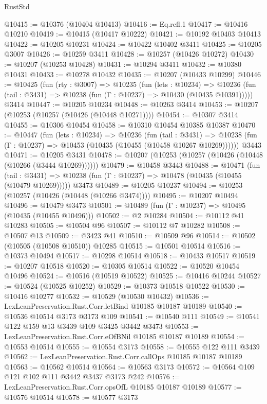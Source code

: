 \begin{lexlean}{RustStd}
\begin{coremodule}
@10415 := @10376 (@10404 @10413)
@10416 := Eq.refl.{1}
@10417 := @10416 @10210
@10419 := @10415 (@10417 @10222)
@10421 := @10192 @10403 @10413
@10422 := @10205 @10231
@10424 := @10422 @10402 @3411
@10425 := @10205 @3007
@10426 := @10259 @3411
@10428 := @10257 (@10426 @10272)
@10430 := @10207 (@10253 @10428)
@10431 := @10294 @3411
@10432 := @10380 @10431
@10433 := @10278 @10432
@10435 := @10207 (@10433 @10299)
@10446 := @10425
    (fun (rty : @3007) =>
    @10235
      (fun (lets : @10234) =>
      @10236 (fun (tail : @3431) => @10238 (fun (Γ : @10237) => @10430 (@10435 @10391)))))
    @3414
@10447 := @10205 @10234
@10448 := @10263 @3414
@10453 := @10207 (@10253 (@10257 (@10426 (@10448 @10271))))
@10454 := @10307 @3414
@10455 := @10306 @10454
@10458 := @10310 @10454 @10385 @10387
@10470 := @10447
    (fun (lets : @10234) =>
    @10236
      (fun (tail : @3431) =>
      @10238 (fun (Γ : @10237) => @10453 (@10435 (@10455 (@10458 @10267 @10269))))))
    @3443
@10471 := @10205 @3431
@10478 := @10207 (@10253 (@10257 (@10426 (@10448 (@10266 (@3444 @10269))))))
@10479 := @10458 @3443
@10488 := @10471
    (fun (tail : @3431) => @10238 (fun (Γ : @10237) => @10478 (@10435 (@10455 (@10479 @10269)))))
    @3473
@10489 := @10205 @10237
@10494 := @10253 (@10257 (@10426 (@10448 (@10266 @3474))))
@10495 := @10207 @10494
@10496 := @10479 @3473
@10501 := @10489 (fun (Γ : @10237) => @10495 (@10435 (@10455 @10496)))
@10502 := @2 @10284
@10504 := @10112 @41 @10283
@10505 := @10504 @96
@10507 := @10112 @7 @10282
@10508 := @10507 @13
@10509 := @3423 @41
@10510 := @10509 @96
@10514 := @10502 (@10505 (@10508 @10510)) @10285
@10515 := @10501 @10514
@10516 := @10373 @10494
@10517 := @10298 @10514
@10518 := @10433 @10517
@10519 := @10207 @10518
@10520 := @10305 @10514
@10522 := @10520 @10454 @10496
@10524 := @10516 (@10519 @10522)
@10525 := @10416 @10244
@10527 := @10524 (@10525 @10252)
@10529 := @10373 @10518 @10522
@10530 := @10416 @10277
@10532 := @10529 (@10530 @10432)
@10536 := LexLeanPreservation.Rust.Corr.letBind @10185 @10187 @10189
@10540 := @10536 @10514 @3173 @3173 @109
@10541 := @10540 @111
@10549 := @10541 @122 @159 @13 @3439 @109 @3425 @3442 @3473
@10553 := LexLeanPreservation.Rust.Corr.eOfBNil @10185 @10187 @10189
@10554 := @10553 @10514
@10555 := @10554 @3173
@10558 := @10555 @122 @111 @3439
@10562 := LexLeanPreservation.Rust.Corr.callOps @10185 @10187 @10189
@10563 := @10562 @10514
@10564 := @10563 @3173
@10572 := @10564 @109 @121 @102 @111 @3442 @3437 @3173 @242
@10576 := LexLeanPreservation.Rust.Corr.opsOfL @10185 @10187 @10189
@10577 := @10576 @10514
@10578 := @10577 @3173

\end{coremodule}
\end{lexlean}

